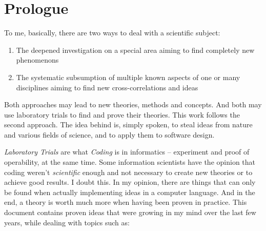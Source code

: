 %
%
%
%
%
%
%

\section*{Prologue}
\label{prologue_heading}

To me, basically, there are two ways to deal with a scientific subject:

\begin{enumerate}
    \item The deepened investigation on a special area aiming to find
        completely new phenomenons
    \item The systematic subsumption of multiple known aspects of one or many
        disciplines aiming to find new cross-correlations and ideas
\end{enumerate}

Both approaches may lead to new theories, methods and concepts. And both may use
laboratory trials to find and prove their theories. This work follows the second
approach. The idea behind is, simply spoken, to steal ideas from nature and
various fields of science, and to apply them to software design.

\emph{Laboratory Trials} are what \emph{Coding} is in informatics -- experiment
and proof of operability, at the same time. Some information scientists have
the opinion that coding weren't \emph{scientific} enough and not necessary to
create new theories or to achieve good results. I doubt this. In my opinion,
there are things that can only be found when actually implementing ideas in a
computer language. And in the end, a theory is worth much more when having been
proven in practice. This document contains proven ideas that were growing in my
mind over the last few years, while dealing with topics such as:

